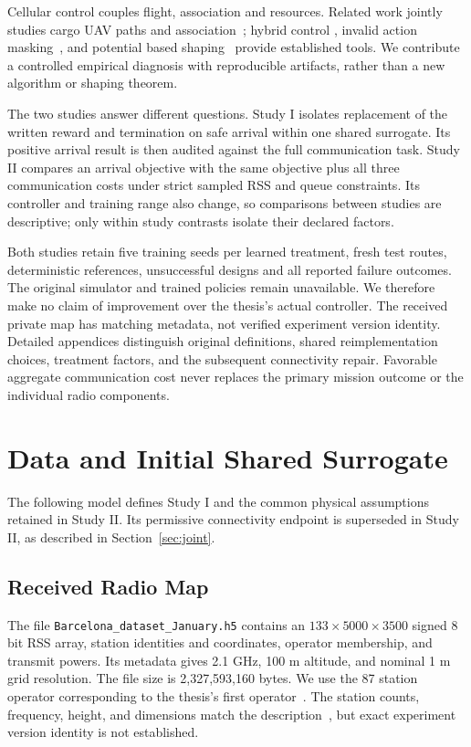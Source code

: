 \documentclass[conference]{IEEEtran}
\begin{document}
Cellular control couples flight, association and resources. Related work
jointly studies cargo UAV paths and association~\cite{cherif}; hybrid control
\cite{hybrid}, invalid action masking~\cite{masking}, and potential based
shaping~\cite{shaping} provide established tools. We contribute a controlled
empirical diagnosis with reproducible artifacts, rather than a new algorithm
or shaping theorem.

The two studies answer different questions. Study I isolates replacement of
the written reward and termination on safe arrival within one shared surrogate.
Its positive arrival result is then audited against the full communication
task. Study II compares an arrival objective with the same objective plus all
three communication costs under strict sampled RSS and queue constraints.
Its controller and training range also change, so comparisons between studies
are descriptive; only within study contrasts isolate their declared factors.

Both studies retain five training seeds per learned treatment, fresh test
routes, deterministic references, unsuccessful designs and all reported
failure outcomes. The original simulator and trained policies remain unavailable.
We therefore make no claim of improvement over the thesis's actual controller.
The received private map has matching metadata, not verified experiment version
identity. Detailed appendices distinguish original definitions, shared
reimplementation choices, treatment factors, and the subsequent connectivity
repair. Favorable aggregate communication cost never replaces the primary
mission outcome or the individual radio components.

\section{Data and Initial Shared Surrogate}
\label{sec:shared}
The following model defines Study I and the common physical assumptions retained
in Study II. Its permissive connectivity endpoint is superseded in
Study II, as described in Section~\ref{sec:joint}.

\subsection{Received Radio Map}
The file \texttt{Barcelona\_dataset\_January.h5} contains an
\(133\times5000\times3500\) signed 8 bit RSS array, station identities and
coordinates, operator membership, and transmit powers. Its metadata gives
2.1 GHz, 100 m altitude, and nominal 1 m grid resolution. The file size is
2,327,593,160 bytes. We use the 87 station operator corresponding to the thesis's
first operator~\cite[p.~14, Sec.~6.1]{thesis}. The station counts, frequency,
height, and dimensions match the description~\cite[p.~6, Sec.~3.1.1;
p.~7, Table~2]{thesis}, but exact experiment version identity is not established.
\end{document}
